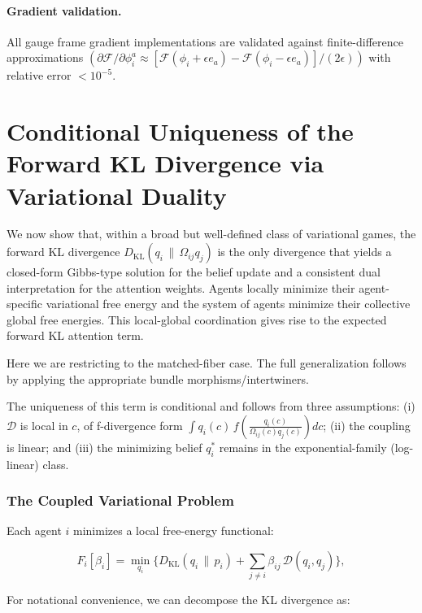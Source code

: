 \documentclass[twoside,11pt]{article}
\begin{document}
\paragraph{Gradient validation.} All gauge frame gradient implementations are validated against finite-difference approximations $(\partial \mathcal{F}/\partial \phi_i^a \approx [\mathcal{F}(\phi_i + \epsilon e_a) - \mathcal{F}(\phi_i - \epsilon e_a)]/(2\epsilon))$ with relative error $< 10^{-5}$.


\section{Conditional Uniqueness of the Forward KL Divergence via Variational Duality}

We now show that, within a broad but well-defined class of variational games, the forward KL divergence $D_{\mathrm{KL}}(q_i \,\|\, \Omega_{ij} q_j)$ is the only divergence that yields a closed-form Gibbs-type solution for the belief update and a consistent dual interpretation for the attention weights.  Agents locally minimize their agent-specific variational free energy and the system of agents minimize their collective global free energies.  This local-global coordination gives rise to the expected forward KL attention term.

Here we are restricting to the matched-fiber case.  The full generalization follows by applying the appropriate bundle morphisms/intertwiners.

The uniqueness of this term is conditional and follows from three assumptions: (i) $\mathcal{D}$ is local in $c$, of f-divergence form $\displaystyle \int q_i(c)\, f\!\left(\frac{q_i(c)}{\Omega_{ij}(c) q_j(c)}\right) dc$; (ii) the coupling is linear; and (iii) the minimizing belief $q_i^*$ remains in the exponential-family (log-linear) class.

\subsubsection{The Coupled Variational Problem}
Each agent $i$ minimizes a local free-energy functional:

\begin{equation}
F_i[\beta_i]
=\min_{q_i}
\Big\{
D_{\mathrm{KL}}(q_i \,\|\, p_i)
+ \sum_{j\neq i} \beta_{ij}\,\mathcal{D}(q_i,q_j)
\Big\},
\label{eq:F_i}
\end{equation}

For notational convenience, we can decompose the KL divergence as:
\end{document}
